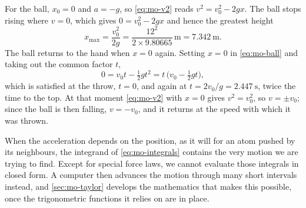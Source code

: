 For the ball, $x_0 = 0$ and $a = -g$, so \cref{eq:mo-v2} reads $v^2 =
v_0^2 - 2gx$. The ball stops rising where $v = 0$, which gives $0 = v_0^2
- 2gx$ and hence the greatest height
\begin{equation*}
   x_{\max} = \frac{v_0^2}{2g} = \frac{12^2}{2\times9.80665}\,\si{\metre}
   = \SI{7.342}{\metre}.
\end{equation*}
The ball returns to the hand when $x = 0$ again. Setting $x = 0$ in
\cref{eq:mo-ball} and taking out the common factor $t$,
\begin{equation*}
   0 = v_0 t - \tfrac12 g t^2 = t\,\bigl(v_0 - \tfrac12 g t\bigr),
\end{equation*}
which is satisfied at the throw, $t = 0$, and again at $t = 2v_0/g =
\SI{2.447}{\second}$, twice the time to the top. At that moment
\cref{eq:mo-v2} with $x = 0$ gives $v^2 = v_0^2$, so $v = \pm v_0$; since
the ball is then falling, $v = -v_0$, and it returns at the speed with
which it was thrown.

When the acceleration depends on the position, as it will for an atom
pushed by its neighbours, the integrand of \cref{eq:mo-integrals} contains
the very motion we are trying to find. Except for special force laws,
we cannot evaluate those integrals in closed form. A computer then
advances the motion through many short intervals instead, and
\cref{sec:mo-taylor} develops the mathematics that makes this possible,
once the trigonometric functions it relies on are in place.

